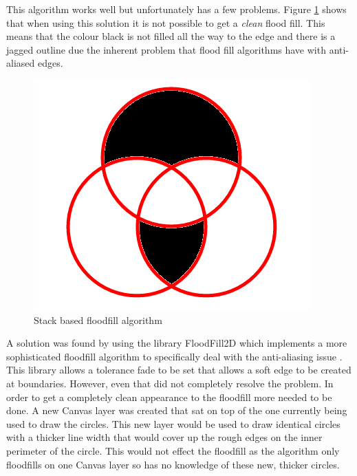 \documentclass[12pt,a4paper]{report}
\begin{document}
This algorithm works well but unfortunately has a few problems. Figure \ref{fig:floodFillBad} shows that when using this solution it is not possible to get a \textit{clean} flood fill. This means that the colour black is not filled all the way to the edge and there is a jagged outline due the inherent problem that flood fill algorithms have with anti-aliased edges.

\begin{figure}[h]
\centering
    \includegraphics[scale=0.5]{floodFillBad}
    \caption{Stack based floodfill algorithm}
    \label{fig:floodFillBad}
\end{figure}
\FloatBarrier

	A solution was found by using the library FloodFill2D which implements a more sophisticated floodfill algorithm to specifically deal with the anti-aliasing issue \citep{blindman67}. This library allows a tolerance fade to be set that allows a soft edge to be created at boundaries. However, even that did not completely resolve the problem. In order to get a completely clean appearance to the floodfill more needed to be done. A new Canvas layer was created that sat on top of the one currently being used to draw the circles. This new layer would be used to draw identical circles with a thicker line width that would cover up the rough edges on the inner perimeter of the circle. This would not effect the floodfill as the algorithm only floodfills on one Canvas layer so has no knowledge of these new, thicker circles.
	
\end{document}
